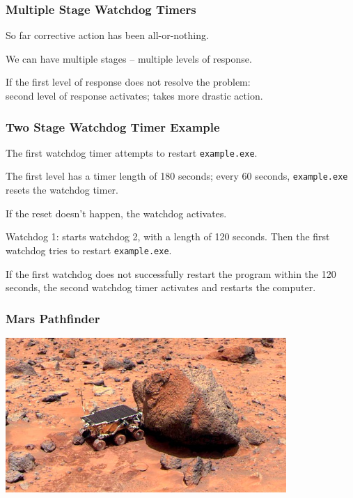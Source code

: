\begin{frame}
\frametitle{Multiple Stage Watchdog Timers}
\begin{changemargin}{1cm}
So far corrective action has been all-or-nothing. 

We can have multiple stages -- multiple levels of response. 

If the first level of response does not resolve the problem: \\
\quad second level of response activates; takes more drastic action. 


\end{changemargin}
\end{frame}

\begin{frame}
\frametitle{Two Stage Watchdog Timer Example}
\begin{changemargin}{1cm}

The first watchdog timer attempts to restart \texttt{example.exe}. 

The first level has a timer length of 180 seconds; every 60 seconds, \texttt{example.exe} resets the watchdog timer. 

If the reset doesn't happen, the watchdog activates. 

Watchdog 1: starts watchdog 2, with a length of 120 seconds. Then the first watchdog tries to restart \texttt{example.exe}. 

If the first watchdog does not successfully restart the program within the 120 seconds, the second watchdog timer activates and restarts the computer.


\end{changemargin}
\end{frame}

\begin{frame}
\frametitle{Mars Pathfinder}
\begin{changemargin}{1cm}

\begin{center}
	\includegraphics[width=0.8\textwidth]{images/Pathfinder01.jpg}
\end{center}

\end{changemargin}
\end{frame}


